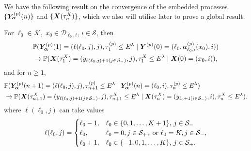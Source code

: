 We have the following result on the convergence of the embedded processes \(\{\bm{Y}_{\bm{\alpha}}^{(p)}(n)\}\) and \(\{\boldsymbol X(\tau_n^X)\}\), which we also will utilise later to prove a global result.
\begin{lem}\label{cor: aln222222} For \(\ell_0\in\mathcal K,\) \(x_0\in\mathcal D_{\ell_0,i}\), \(i\in\mathcal S\), 
	then
	\begin{align}
		&\mathbb P(\bm{Y}_{\bm{\alpha}}^{(p)}(1) = (\ell(\ell_0,j),j), \tau_1^{(p)}\leq E^\lambda
            	 \mid \boldsymbol Y^{(p)}(0) = (\ell_0,\boldsymbol a_{\ell_0,i}^{(p)}(x_0),i)) \nonumber
		\\&\to  
			\mathbb P(\boldsymbol X(\tau_1^X) = (y_{\ell(\ell_0,j)+1(j\in\mathcal{S}_-)}, j), \tau_1^{X}\leq E^\lambda \mid \boldsymbol X(0) = (x_0,i)),\label{eqn: lim 1}
	\end{align}
	and for \(n\geq 1\), 
	\begin{align}
		&\mathbb P(\bm{Y}_{\bm{\alpha}}^{(p)}(n+1) = (\ell(\ell_0,j),j), \tau_{n+1}^{(p)}\leq E^\lambda
            	 \mid \bm{Y}_{\bm{\alpha}}^{(p)}(n) = (\ell_0,i), \tau_n^{(p)}\leq E^\lambda) \nonumber
		\\&\to  
			\mathbb P(\boldsymbol X(\tau_{n+1}^X) = (y_{\ell(\ell_0,j)+1(j\in\mathcal{S}_-)}, j), \tau_{n+1}^{X}\leq E^\lambda \mid \boldsymbol X(\tau_{n}^X) = (y_{\ell_0+1(i\in\mathcal{S}_-)},i), \tau_n^{X}\leq E^\lambda).\label{eqn: ddddddd}
	\end{align}
	where \(\ell(\ell_0,j)\) can take values
	\begin{align}
		\ell(\ell_0,j) = \begin{cases}
			\ell_0-1, & \ell_0\in\{0,1,\dots,K+1\},\, j\in\mathcal{S}_-\\
			\ell_0, & \ell_0 = 0, j\in\mathcal S_+, \mbox{ or }\ell_0 = K, j\in\mathcal S_-,\\
			\ell_0+1, & \ell_0\in\{-1,0,1,\dots,K\},\, j\in\mathcal{S}_+.
		\end{cases}
	\end{align}
\end{lem}
